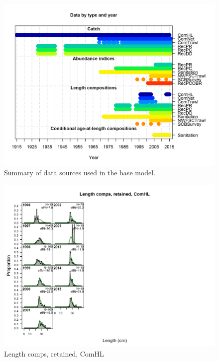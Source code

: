 \documentclass[12pt,]{article}
\begin{document}
\begin{figure}[htbp]
\centering
\includegraphics{r4ss/plots_mod1/data_plot.png}
\caption{Summary of data sources used in the base model.
\label{fig:data_plot}}
\end{figure}

\FloatBarrier

\FloatBarrier

\FloatBarrier

\FloatBarrier

\FloatBarrier

\FloatBarrier

\begin{figure}[htbp]
\centering
\includegraphics{./r4ss/plots_mod1/comp_lenfit_flt1mkt2.png}
\caption{Length comps, retained, ComHL
\label{fig:mod1_1_comp_lenfit_flt1mkt2}}
\end{figure}
\end{document}
